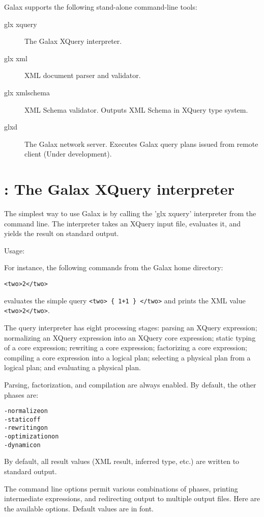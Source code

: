 Galax supports the following stand-alone command-line tools:

\begin{description}
\item[glx xquery] The Galax XQuery interpreter.               
\item[glx xml] XML document parser and validator. 
\item[glx xmlschema] XML Schema validator.  Outputs XML Schema in XQuery type system.
\item[glxd] The Galax network server.  Executes Galax query plans
  issued from remote client (Under development).
\end{description}

\section{ : The Galax XQuery interpreter}
The simplest way to use Galax is by calling the 'glx xquery'
interpreter from the command line. The interpreter takes an XQuery
input file, evaluates it, and yields the result on standard output.

Usage: 

For instance, the following commands from the Galax home directory:
\begin{alltt}
%  echo "<two> { 1+1 } </two>" > test.xq
%  $(GALAXHOME)/bin/glx xquery test.xq
<two>2</two>
\end{alltt}
evaluates the simple query \verb|<two> { 1+1 } </two>| and prints the
XML value \verb|<two>2</two>|.

The query interpreter has eight processing stages:
   parsing an XQuery expression;
   normalizing an XQuery expression into an XQuery core expression;
   static typing of a core expression;
   rewriting a core expression;
   factorizing a core expression;
   compiling a core expression into a logical plan;
   selecting a physical plan from a logical plan;
   and evaluating a physical plan.

Parsing, factorization, and compilation are always enabled. By default, the other phases are:
\begin{alltt}
   -normalize on 
   -static off   
   -rewriting on 
   -optimization on
   -dynamic on 
\end{alltt}
By default, all result values (XML result, inferred type, etc.) are written
to standard output.

The command line options permit various combinations of phases,
printing intermediate expressions, and redirecting output to multiple
output files.  Here are the available options.  Default values are in
 font.

